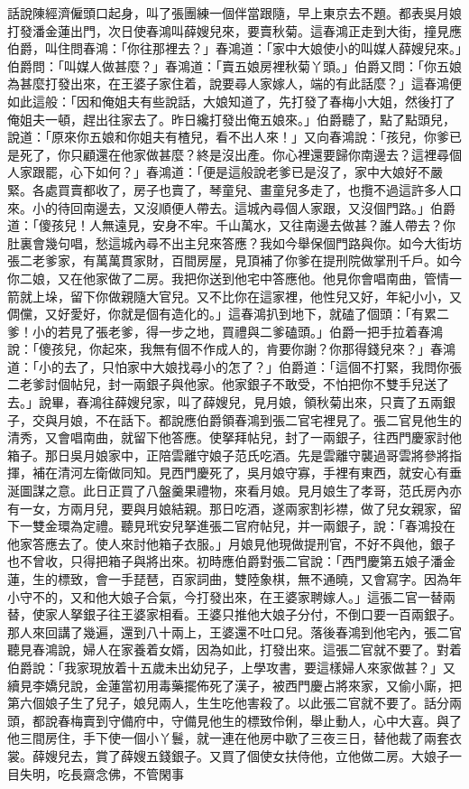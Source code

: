 \begin{showcontents}{}
話說陳經濟僱頭口起身，叫了張團練一個伴當跟隨，早上東京去不題。都表吳月娘打發潘金蓮出門，次日使春鴻叫薛嫂兒來，要賣秋菊。這春鴻正走到大街，撞見應伯爵，叫住問春鴻：「你往那裡去？」春鴻道：「家中大娘使小的叫媒人薛嫂兒來。」伯爵問：「叫媒人做甚麼？」春鴻道：「賣五娘房裡秋菊丫頭。」伯爵又問：「你五娘為甚麼打發出來，在王婆子家住着，說要尋人家嫁人，端的有此話麼？」這春鴻便如此這般：「因和俺姐夫有些說話，大娘知道了，先打發了春梅小大姐，然後打了俺姐夫一頓，趕出往家去了。昨日纔打發出俺五娘來。」伯爵聽了，點了點頭兒，說道：「原來你五娘和你姐夫有楂兒，看不出人來！」又向春鴻說：「孩兒，你爹已是死了，你只顧還在他家做甚麼？終是沒出產。你心裡還要歸你南邊去？這裡尋個人家跟罷，心下如何？」春鴻道：「便是這般說老爹已是沒了，家中大娘好不嚴緊。各處買賣都收了，房子也賣了，琴童兒、畫童兒多走了，也攬不過這許多人口來。小的待回南邊去，又沒順便人帶去。這城內尋個人家跟，又沒個門路。」伯爵道：「傻孩兒！人無遠見，安身不牢。千山萬水，又往南邊去做甚？誰人帶去？你肚裏會幾句唱，愁這城內尋不出主兒來答應？我如今舉保個門路與你。如今大街坊張二老爹家，有萬萬貫家財，百間房屋，見頂補了你爹在提刑院做掌刑千戶。如今你二娘，又在他家做了二房。我把你送到他宅中答應他。他見你會唱南曲，管情一箭就上垛，留下你做親隨大官兒。又不比你在這家裡，他性兒又好，年紀小小，又倜儻，又好愛好，你就是個有造化的。」這春鴻扒到地下，就磕了個頭：「有累二爹！小的若見了張老爹，得一步之地，買禮與二爹磕頭。」伯爵一把手拉着春鴻說：「傻孩兒，你起來，我無有個不作成人的，肯要你謝？你那得錢兒來？」春鴻道：「小的去了，只怕家中大娘找尋小的怎了？」伯爵道：「這個不打緊，我問你張二老爹討個帖兒，封一兩銀子與他家。他家銀子不敢受，不怕把你不雙手兒送了去。」說畢，春鴻往薛嫂兒家，叫了薛嫂兒，見月娘，領秋菊出來，只賣了五兩銀子，交與月娘，不在話下。都說應伯爵領春鴻到張二官宅裡見了。張二官見他生的清秀，又會唱南曲，就留下他答應。使拏拜帖兒，封了一兩銀子，往西門慶家討他箱子。那日吳月娘家中，正陪雲離守娘子范氏吃酒。先是雲離守襲過哥雲將參將指揮，補在清河左衛做同知。見西門慶死了，吳月娘守寡，手裡有東西，就安心有垂涎圖謀之意。此日正買了八盤羹果禮物，來看月娘。見月娘生了孝哥，范氏房內亦有一女，方兩月兒，要與月娘結親。那日吃酒，遂兩家割衫襟，做了兒女親家，留下一雙金環為定禮。聽見玳安兒拏進張二官府帖兒，并一兩銀子，說：「春鴻投在他家答應去了。使人來討他箱子衣服。」月娘見他現做提刑官，不好不與他，銀子也不曾收，只得把箱子與將出來。初時應伯爵對張二官說：「西門慶第五娘子潘金蓮，生的標致，會一手琵琶，百家詞曲，雙陸象棋，無不通曉，又會寫字。因為年小守不的，又和他大娘子合氣，今打發出來，在王婆家聘嫁人。」這張二官一替兩替，使家人拏銀子往王婆家相看。王婆只推他大娘子分付，不倒口要一百兩銀子。那人來回講了幾遍，還到八十兩上，王婆還不吐口兒。落後春鴻到他宅內，張二官聽見春鴻說，婦人在家養着女婿，因為如此，打發出來。這張二官就不要了。對着伯爵說：「我家現放着十五歲未出幼兒子，上學攻書，要這樣婦人來家做甚？」又續見李嬌兒說，金蓮當初用毒藥擺佈死了漢子，被西門慶占將來家，又偷小廝，把第六個娘子生了兒子，娘兒兩人，生生吃他害殺了。以此張二官就不要了。話分兩頭，都說春梅賣到守備府中，守備見他生的標致伶俐，舉止動人，心中大喜。與了他三間房住，手下使一個小丫鬟，就一連在他房中歇了三夜三日，替他裁了兩套衣裳。薛嫂兒去，賞了薛嫂五錢銀子。又買了個使女扶侍他，立他做二房。大娘子一目失明，吃長齋念佛，不管閑事
\end{showcontents}
